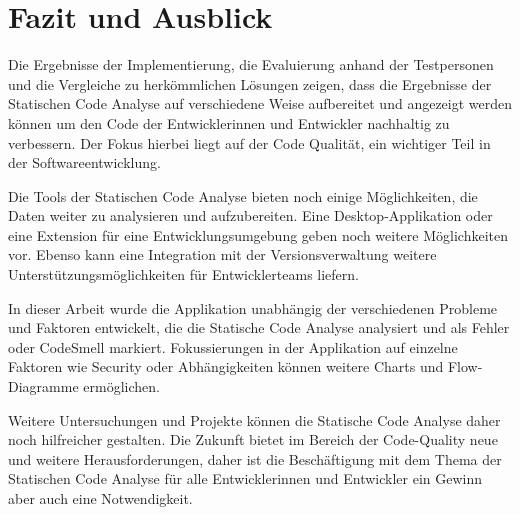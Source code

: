 \chapter{Fazit und Ausblick}
\label{chap:conclusion}
\chapterstart
Die Ergebnisse der Implementierung, die Evaluierung anhand der Testpersonen und die Vergleiche zu herkömmlichen Lösungen zeigen, dass die Ergebnisse der Statischen Code Analyse auf verschiedene Weise aufbereitet und angezeigt werden können um den Code der Entwicklerinnen und Entwickler nachhaltig zu verbessern. Der Fokus hierbei liegt auf der Code Qualität, ein wichtiger Teil in der Softwareentwicklung.

Die Tools der Statischen Code Analyse bieten noch einige Möglichkeiten, die Daten weiter zu analysieren und aufzubereiten. Eine Desktop-Applikation oder eine Extension für eine Entwicklungsumgebung geben noch weitere Möglichkeiten vor. Ebenso kann eine Integration mit der Versionsverwaltung weitere Unterstützungsmöglichkeiten für Entwicklerteams liefern.

In dieser Arbeit wurde die Applikation unabhängig der verschiedenen Probleme und Faktoren entwickelt, die die Statische Code Analyse analysiert und als Fehler oder CodeSmell markiert. Fokussierungen in der Applikation auf einzelne Faktoren wie Security oder Abhängigkeiten können weitere Charts und Flow-Diagramme ermöglichen.

Weitere Untersuchungen und Projekte können die Statische Code Analyse daher noch hilfreicher gestalten. Die Zukunft bietet im Bereich der Code-Quality neue und weitere Herausforderungen, daher ist die Beschäftigung mit dem Thema der Statischen Code Analyse für alle Entwicklerinnen und Entwickler ein Gewinn aber auch eine Notwendigkeit.


\chapterend
